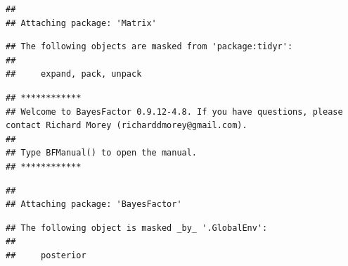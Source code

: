 \documentclass[
]{book}
\begin{document}
\begin{verbatim}
## 
## Attaching package: 'Matrix'
\end{verbatim}

\begin{verbatim}
## The following objects are masked from 'package:tidyr':
## 
##     expand, pack, unpack
\end{verbatim}

\begin{verbatim}
## ************
## Welcome to BayesFactor 0.9.12-4.8. If you have questions, please contact Richard Morey (richarddmorey@gmail.com).
## 
## Type BFManual() to open the manual.
## ************
\end{verbatim}

\begin{verbatim}
## 
## Attaching package: 'BayesFactor'
\end{verbatim}

\begin{verbatim}
## The following object is masked _by_ '.GlobalEnv':
## 
##     posterior
\end{verbatim}
\end{document}
